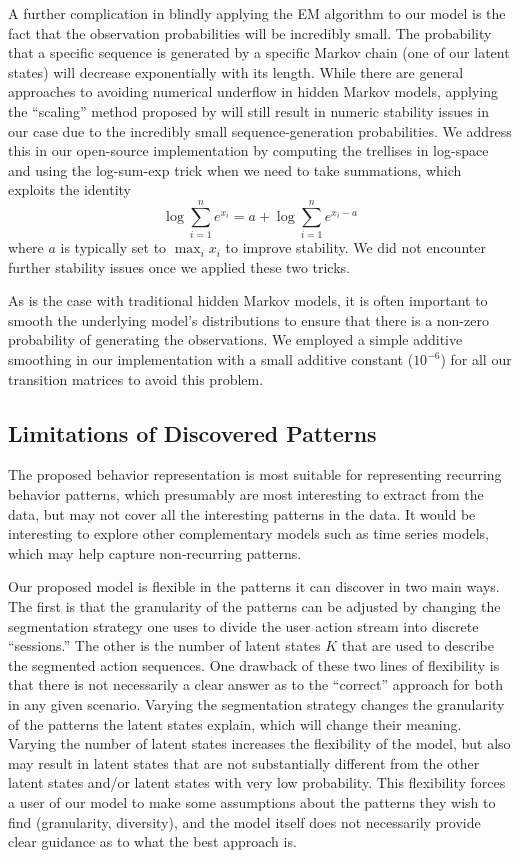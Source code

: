 A further complication in blindly applying the EM algorithm to our model is
the fact that the observation probabilities will be incredibly small. The
probability that a specific sequence is generated by a specific Markov
chain (one of our latent states) will decrease exponentially with its
length. While there are general approaches to avoiding numerical underflow
in hidden Markov models, applying the ``scaling'' method proposed by
\citet{Rabiner:1990:RSR} will still result in numeric stability issues in
our case due to the incredibly small sequence-generation probabilities. We
address this in our open-source implementation by computing the trellises
in log-space and using the log-sum-exp trick when we need to take
summations, which exploits the identity
\begin{equation}
    \log \sum_{i=1}^n e^{x_i} = a + \log \sum_{i=1}^n e^{x_i - a}
\end{equation}
where $a$ is typically set to $\max_i x_i$ to improve stability. We did not
encounter further stability issues once we applied these two tricks.

As is the case with traditional hidden Markov models, it is often important
to smooth the underlying model's distributions to ensure that there is a
non-zero probability of generating the observations. We employed a simple
additive smoothing in our implementation with a small additive constant
($10^{-6}$) for all our transition matrices to avoid this problem.

\subsection{Limitations of Discovered Patterns}

The proposed behavior representation is most suitable for representing
recurring behavior patterns, which presumably are most interesting to
extract from the data, but may not cover all the interesting patterns in
the data. It would be interesting to explore other complementary models
such as time series models, which may help capture non-recurring patterns.

Our proposed model is flexible in the patterns it can discover in two main
ways. The first is that the granularity of the patterns can be adjusted by
changing the segmentation strategy one uses to divide the user action
stream into discrete ``sessions.'' The other is the number of latent
states $K$ that are used to describe the segmented action sequences. One
drawback of these two lines of flexibility is that there is not necessarily
a clear answer as to the ``correct'' approach for both in any given
scenario. Varying the segmentation strategy changes the granularity of the
patterns the latent states explain, which will change their meaning.
Varying the number of latent states increases the flexibility of the model,
but also may result in latent states that are not substantially different
from the other latent states and/or latent states with very low
probability. This flexibility forces a user of our model to make some
assumptions about the patterns they wish to find (granularity, diversity),
and the model itself does not necessarily provide clear guidance as to what
the best approach is.

